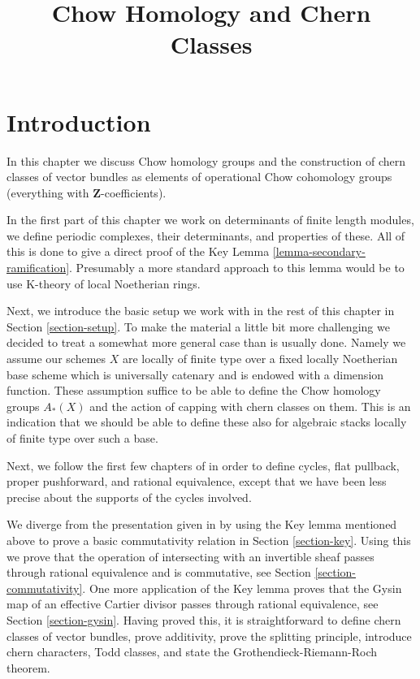 

%


\title{Chow Homology and Chern Classes}

\maketitle

\label{section-phantom}


\tableofcontents


\section{Introduction}
\label{section-introduction}

\noindent
In this chapter we discuss Chow homology groups and the construction
of chern classes of vector bundles as elements of operational
Chow cohomology groups (everything with $\mathbf{Z}$-coefficients).

\medskip\noindent
In the first part of this chapter we work on determinants of finite
length modules, we define periodic complexes, their determinants,
and properties of these. All of this is done to give a direct proof
of the Key Lemma \ref{lemma-secondary-ramification}.
Presumably a more standard approach to this lemma would be to
use K-theory of local Noetherian rings.

\medskip\noindent
Next, we introduce the basic setup we work with in the rest of this
chapter in Section \ref{section-setup}. To make the material a little
bit more challenging we decided to treat a somewhat more general case
than is usually done. Namely we assume our schemes $X$ are locally of
finite type over a fixed locally Noetherian base scheme which is universally
catenary and is endowed with a dimension function. These assumption suffice
to be able to define the Chow homology groups $A_*(X)$ and the action of
capping with chern classes on them. This is an indication that we should
be able to define these also for algebraic stacks locally of finite type
over such a base.

\medskip\noindent
Next, we follow the first few chapters of \cite{F} in order to define
cycles, flat pullback, proper pushforward, and rational equivalence,
except that we have been less precise about the supports of the cycles
involved.

\medskip\noindent
We diverge from the presentation given in \cite{F} by using the
Key lemma mentioned above to prove a basic commutativity relation in
Section \ref{section-key}. Using this we prove that the operation
of intersecting with an invertible sheaf passes through rational
equivalence and is commutative, see Section \ref{section-commutativity}.
One more application of the Key
lemma proves that the Gysin map of an effective Cartier divisor
passes through rational equivalence, see Section \ref{section-gysin}.
Having proved this, it is straightforward to define chern
classes of vector bundles, prove additivity, prove the splitting principle,
introduce chern characters, Todd classes, and state the
Grothendieck-Riemann-Roch theorem.

